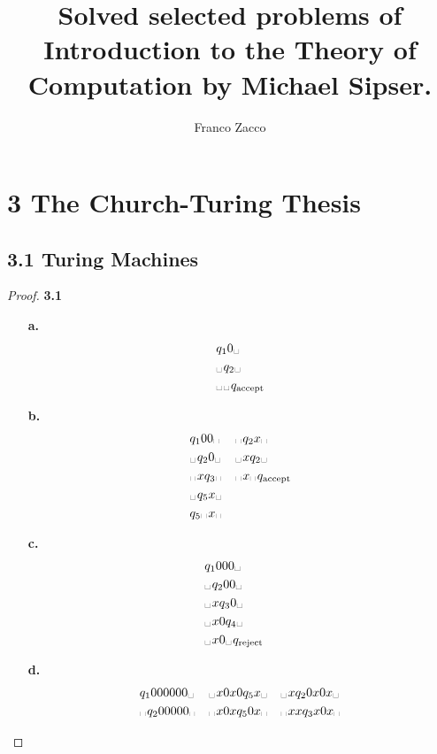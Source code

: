 \documentclass[11pt]{article}
\title{\textbf{Solved selected problems of Introduction to the Theory of Computation by Michael Sipser.}}
\author{Franco Zacco}
\date{}
\newcommand{\esp}{\text{\textvisiblespace}\hspace{0.1em}}
\theoremstyle{definition}
\begin{document}
\maketitle
\thispagestyle{empty}

\section*{3 The Church-Turing Thesis}
\subsection*{3.1 Turing Machines}

\begin{proof}{\textbf{3.1}}
\begin{itemize}
    \item [\textbf{a.}]
    \begin{align*}
        &q_1 0 \esp\\
        &\esp q_2 \esp\\
        &\esp \esp q_{\text{accept}}
    \end{align*}
    \item [\textbf{b.}]
    \[
    \begin{aligned}
        &q_1 0 0 \esp     &  &\esp q_2 x \esp\\
        &\esp q_2 0 \esp  &  &\esp x q_2\esp\\
        &\esp x q_3 \esp  &  &\esp x \esp q_{\text{accept}}\\
        &\esp q_5 x \esp  & \\
        &q_5 \esp x \esp  & \\
    \end{aligned}
    \]
    \item [\textbf{c.}]
    \[
    \begin{aligned}
        &q_1 0 0 0\esp      & \\
        &\esp q_2 0 0\esp   & \\
        &\esp x q_3 0 \esp  & \\
        &\esp x 0 q_4 \esp  & \\
        &\esp x 0 \esp q_{\text{reject}}
    \end{aligned}
    \]
    \item [\textbf{d.}] 
    \[
    \begin{aligned}
        &q_1 0 0 0 0 0 0\esp    & &\esp x 0 x 0 q_5 x \esp & &\esp x q_2 0 x 0 x \esp \\
        &\esp q_2 0 0 0 0 0\esp & &\esp x 0 x q_5 0 x \esp & &\esp x x q_3 x 0 x \esp \\

\end{aligned}\]
\end{itemize}
\end{proof}
\end{document}
